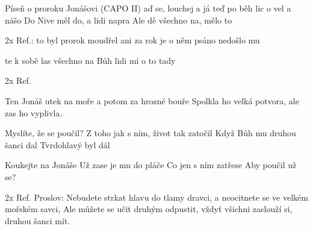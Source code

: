 \begin{TEXT}{Píseň o proroku Jonášovi}
\SLOKA* (CAPO II)\NL
\SLOKA* {}aď se, louchej a já  teď po\NL
{}běh lic o vel a nášo\NL
Do Nive měl do, a  lidi napra\NL
Ale dě všechno na,  mělo to 

\REFREN 2x Ref.:  to byl prorok  \NL
{}moudřel ani za rok  \NL
{} je o něm psáno  \NL
{} nedošlo mu 

\SLOKA {}te k sobě las\NL
{} všechno na\NL
{} Bůh lidi mi\NL
{} o to tady 

\REFREN 2x Ref.

\SLOKA Ten Jonáš utek na moře\NL
a potom za hrozné bouře\NL
Spolkla ho velká potvora,\NL    
ale zas ho vyplivla.

\SLOKA Myslíte, že se poučil?\NL
Z toho jak s ním, život tak zatočil\NL
Když Bůh mu druhou šanci dal\NL
Tvrdohlavý byl dál

\SLOKA Koukejte na Jonáše\NL
Už zase je mu do pláče\NL
Co jen s ním zatřese\NL
Aby poučil už se?

\REFREN 2x Ref.
\SLOKA* Proslov: Nebudete strkat hlavu do tlamy dravci,\NL
a neocitnete se ve velkém mořském savci,\NL
Ale můžete se učit druhým odpustit,\NL
vždyť všichni zaslouží si, druhou šanci mít.
\REFRENHRAJ
\end{TEXT}

